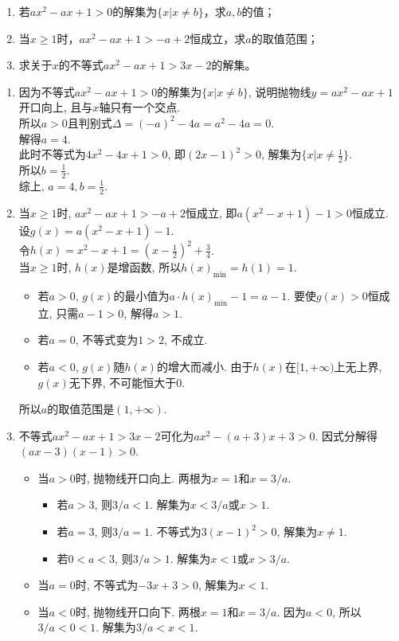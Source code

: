 \begin{liti}
\begin{enumerate}
\item 若$ax^2-ax+1>0$的解集为$\{x|x \neq b\}$，求$a,b$的值；
\item 当$x\geq 1$时，$ax^2-ax+1>-a+2$恒成立，求$a$的取值范围；
\item 求关于$x$的不等式$ax^2-ax+1>3x-2$的解集。
\end{enumerate}
\tcblower

\begin{enumerate}
\item 因为不等式$ax^2-ax+1>0$的解集为$\{x|x \neq b\}$, 说明抛物线$y=ax^2-ax+1$开口向上, 且与$x$轴只有一个交点.\\
所以$a>0$且判别式$\Delta = (-a)^2 - 4a = a^2-4a=0$.\\
解得$a=4$.\\
此时不等式为$4x^2-4x+1>0$, 即$(2x-1)^2>0$, 解集为$\{x|x\neq \frac{1}{2}\}$.\\
所以$b=\frac{1}{2}$.\\
综上, $a=4, b=\frac{1}{2}$.

\item 当$x\geq 1$时, $ax^2-ax+1>-a+2$恒成立, 即$a(x^2-x+1)-1>0$恒成立.\\
设$g(x)=a(x^2-x+1)-1$.\\
令$h(x)=x^2-x+1=(x-\frac{1}{2})^2+\frac{3}{4}$.\\
当$x\ge 1$时, $h(x)$是增函数, 所以$h(x)_{\min}=h(1)=1$.\\
\begin{itemize}
    \item 若$a>0$, $g(x)$的最小值为$a \cdot h(x)_{\min}-1 = a-1$.
    要使$g(x)>0$恒成立, 只需$a-1>0$, 解得$a>1$.
    \item 若$a=0$, 不等式变为$1>2$, 不成立.
    \item 若$a<0$, $g(x)$随$h(x)$的增大而减小. 由于$h(x)$在$[1, +\infty)$上无上界, $g(x)$无下界, 不可能恒大于0.
\end{itemize}
所以$a$的取值范围是$(1, +\infty)$.

\item 不等式$ax^2-ax+1>3x-2$可化为$ax^2-(a+3)x+3>0$.
因式分解得$(ax-3)(x-1)>0$.
\begin{itemize}
    \item 当$a>0$时, 抛物线开口向上. 两根为$x=1$和$x=3/a$.
    \begin{itemize}
        \item 若$a>3$, 则$3/a < 1$. 解集为$x<3/a$或$x>1$.
        \item 若$a=3$, 则$3/a=1$. 不等式为$3(x-1)^2>0$, 解集为$x\neq 1$.
        \item 若$0<a<3$, 则$3/a > 1$. 解集为$x<1$或$x>3/a$.
    \end{itemize}
    \item 当$a=0$时, 不等式为$-3x+3>0$, 解集为$x<1$.
    \item 当$a<0$时, 抛物线开口向下. 两根$x=1$和$x=3/a$. 因为$a<0$, 所以$3/a<0<1$.
    解集为$3/a < x < 1$.
\end{itemize}
\end{enumerate}

\end{liti}